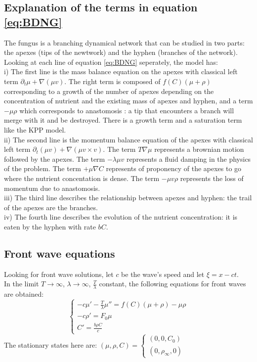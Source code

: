 \documentclass[17pt]{extarticle}
\newcommand{\dt}{\partial_t}
\newcommand{\Tl}{\frac{T}{\lambda}}
\begin{document}
\subsection{Explanation of the terms in equation \eqref{eq:BDNG}}
The fungus is a branching dynamical network that can be studied in two parts: the apexes (tips of the newtwork) and the hyphen (branches of the network).\\
Looking at each line of equation \eqref{eq:BDNG} seperately, the model has:\\
i) The first line is the mass balance equation on the apexes with classical left term $ \dt\mu + \nabla(\mu v)  $. The right term is composed of $f(C)(\mu + \rho)$ corresponding to a growth of the number of apexes depending on the concentration of nutrient and the existing mass of apexes and hyphen, and a term $-\mu\rho$ which corresponds to anastomosis : a tip that encounters a branch will merge with it and be destroyed. There is a growth term and a saturation term like the KPP model.
\\ ii)  The second line is the momentum balance equation of the apexes with classical left term $ \dt(\mu v)+\nabla(\mu v\times v) $. The term $T\nabla\mu$ represents a brownian motion followed by the apexes. The term $-\lambda\mu v$ represents a fluid damping in the physics of the problem. The term $+\mu\nabla C$ represents of proponency of the apexes to go where the nutrient concentation is dense. The term $-\mu v \rho $ represents the loss of momentum due to anastomosis.\\
iii) The third line describes the relationship between apexes and hyphen: the trail of the apexes are the branches.\\
iv) The fourth line describes the evolution of the nutrient concentration: it is eaten by the hyphen with rate $bC$. \newpage
\subsection{Front wave equations}

Looking for front wave solutions, let $c$ be the wave's speed and let $\xi = x - ct$. \\
In the limit $T \rightarrow \infty$, $\lambda \rightarrow \infty$, $\frac{T}{\lambda}$ constant, the following equations for front waves are obtained:
\begin{equation} \left\{ \begin{array}{ll} -c \mu'-\Tl\mu''=f(C)(\mu+\rho)-\mu\rho \\ -c\rho' = F_0\mu  \\C'=\frac{b\rho C}{c} \end{array}\right.
\end{equation}
The stationary states here are: $(\mu,\rho,C) = \left\{ \begin{array}{ll} (0,0,C_0) \\
 (0,\rho_\infty,0) \end{array} \right.$ 
\end{document}
